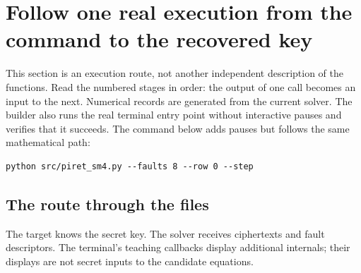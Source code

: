 \clearpage
\section{Follow one real execution from the command to the recovered key}
This section is an execution route, not another independent description of the
functions. Read the numbered stages in order: the output of one call becomes
an input to the next. Numerical records are generated from the current solver.
The builder also runs the real terminal entry point without interactive pauses
and verifies that it succeeds. The command below adds pauses but follows the
same mathematical path:
\begin{Verbatim}
python src/piret_sm4.py --faults 8 --row 0 --step
\end{Verbatim}

\subsection{The route through the files}
\begin{center}
\end{center}
The target knows the secret key. The solver receives ciphertexts and fault
descriptors. The terminal's teaching callbacks display additional internals;
their displays are not secret inputs to the candidate equations.

